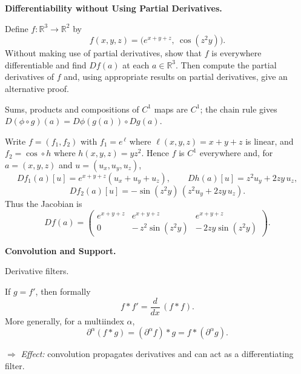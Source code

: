 \begin{problem}[CP-II-0077]
\label{prob:cp-ii-0077}
\textbf{Differentiability without Using Partial Derivatives.}

\hspace*{1.5em}Define $f:\mathbb{R}^3\to\mathbb{R}^2$ by
\[
f(x,y,z)=\big(e^{x+y+z},\ \cos(z^2y)\big).
\]
Without making use of partial derivatives, show that $f$ is everywhere differentiable and find $Df(a)$ at each $a\in\mathbb{R}^3$.
Then compute the partial derivatives of $f$ and, using appropriate results on partial derivatives, give an alternative proof.

Sums, products and compositions of $C^1$ maps are $C^1$; the chain rule gives
$D(\phi\circ g)(a)=D\phi(g(a))\circ Dg(a)$.
\end{problem}

\begin{solution}
Write $f=(f_1,f_2)$ with $f_1=e^{\,\ell}$ where $\ell(x,y,z)=x+y+z$ is linear, and
$f_2=\cos\circ h$ where $h(x,y,z)=yz^2$.
Hence $f$ is $C^1$ everywhere and, for $a=(x,y,z)$ and $u=(u_x,u_y,u_z)$,
\[
Df_1(a)[u]=e^{x+y+z}(u_x+u_y+u_z),\qquad
Dh(a)[u]=z^2u_y+2zy\,u_z,
\]
\[
Df_2(a)[u]=-\sin(z^2y)\,(z^2u_y+2zy\,u_z).
\]
Thus the Jacobian is
\[
Df(a)=
\begin{pmatrix}
	e^{x+y+z} & e^{x+y+z} & e^{x+y+z}\\[3pt]
	0 & -\,z^2\sin(z^2y) & -\,2zy\sin(z^2y)
\end{pmatrix}.
\]
\end{solution}

\begin{problem}[CP-II-0088]
\label{prob:cp-ii-0088}
\textbf{Convolution and Support.}

\hspace*{1.5em}Derivative filters.

If $g = f'$, then formally
\[
f * f'
= \frac{d}{dx}\,(f*f).
\]
More generally, for a multiindex $\alpha$,
\[
\partial^\alpha(f*g)
= (\partial^\alpha f)*g
= f*(\partial^\alpha g).
\]

\medskip
\noindent$\Rightarrow$ \emph{Effect:} convolution propagates derivatives
and can act as a differentiating filter.

\bigskip
\bigskip
\end{problem}

